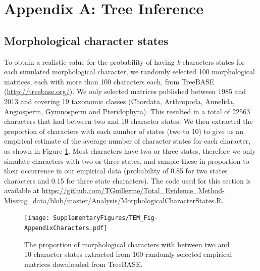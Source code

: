 \documentclass[12pt,letterpaper]{article}
\begin{document}
\section{Appendix A: Tree Inference}

\subsection{Morphological character states}
To obtain a realistic value for the probability of having \textit{k} characters states for each simulated morphological character, we randomly selected 100 morphological matrices, each with more than 100 characters each, from TreeBASE (\url{http://treebase.org/}). We only selected matrices published between 1985 and 2013 and covering 19 taxonomic classes (Chordata, Arthropoda, Annelida, Angiosperm, Gymnosperm and Pteridophyta). This resulted in a total of 22563 characters that had between two and 10 character states. We then extracted the proportion of characters with each number of states (two to 10) to give us an empirical estimate of the average number of character states for each character, as shown in Figure \ref{Fig_AppendixCharacters}. Most characters have two or three states, therefore we only simulate characters with two or three states, and sample these in proportion to their occurrence in our empirical data (probability of 0.85 for two states characters and 0.15 for three state characters). The code used for this section is available at \url{https://github.com/TGuillerme/Total_Evidence_Method-Missing_data/blob/master/Analysis/MorphologicalCharacterStates.R}.

\begin{figure}
\centering
\texttt{[image: SupplementaryFigures/TEM\_Fig-AppendixCharacters.pdf]}
\caption{The proportion of morphological characters with between two and 10 character states extracted from 100 randomly selected empirical matrices downloaded from TreeBASE.}
\label{Fig_AppendixCharacters}
\end{figure}
\end{document}
